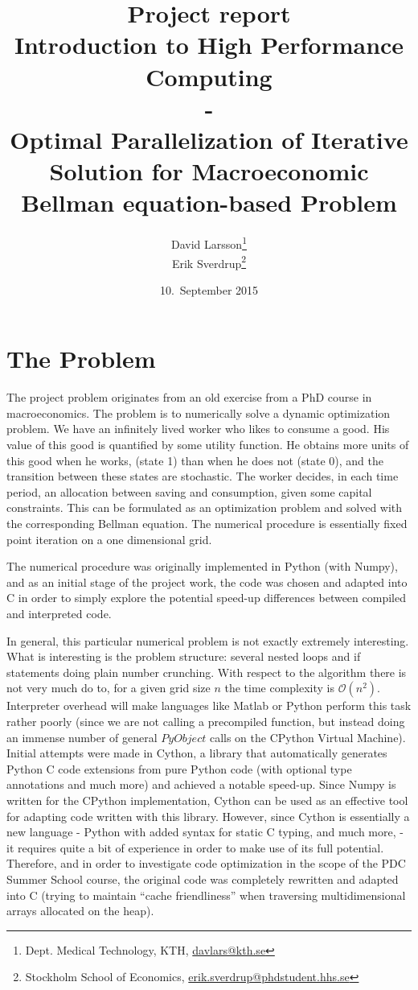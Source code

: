 \documentclass[12pt]{article}
\title{Project report \\ Introduction to High Performance Computing \\ \large - \\ Optimal Parallelization of Iterative Solution for Macroeconomic Bellman equation-based Problem}
\author{David Larsson\footnote{Dept. Medical Technology, KTH, \href{mailto:davlars@kth.se}{davlars@kth.se}} \\ Erik Sverdrup\footnote{Stockholm School of Economics, \href{mailto:erik.sverdrup@phdstudent.hhs.se}{erik.sverdrup@phdstudent.hhs.se}}}
\date{10.~September 2015} %
\begin{document}
\maketitle

\section*{The Problem}
The project problem originates from an old exercise from a PhD course in macroeconomics.  The problem is to numerically solve a dynamic optimization problem. We have an infinitely lived worker who likes to consume a good.  His value of this good is quantified by some utility function. He obtains more units of this good when he works, (state 1) than when he does not (state 0), and the transition between these states are stochastic. The worker decides, in each time period, an allocation between saving and consumption, given some capital constraints. This can be formulated as an optimization problem and solved with the corresponding Bellman equation. The numerical procedure is essentially fixed point iteration on a one dimensional grid.

The numerical procedure was originally implemented in Python (with Numpy), and as an initial stage of the project work, the code was chosen and adapted into C in order to simply explore the potential speed-up differences between compiled and interpreted code.

In general, this particular numerical problem is not exactly extremely interesting.  What is interesting is the problem structure: several nested loops and if statements doing plain number crunching. With respect to the algorithm there is not very much do to, for a given grid size $n$  the time complexity is $\mathcal{O}(n^2)$. Interpreter overhead will make languages like Matlab or Python perform this task rather poorly (since we are not calling a precompiled function, but instead doing an immense number of general $PyObject$ calls on the CPython Virtual Machine). Initial attempts were made in Cython, a library that automatically generates Python C code extensions from pure Python code (with optional type annotations and much more) and achieved a notable speed-up. Since Numpy is written for the CPython implementation, Cython can be used as an effective tool for adapting code written with this library. However, since Cython is essentially a new language - Python with added syntax for static C typing, and much more, - it requires quite a bit of experience in order to make use of its full potential. Therefore, and in order to investigate code optimization in the scope of the PDC Summer School course, the original code was completely rewritten and adapted into C (trying to maintain ``cache friendliness'' when traversing multidimensional arrays allocated on the heap).
\end{document}
